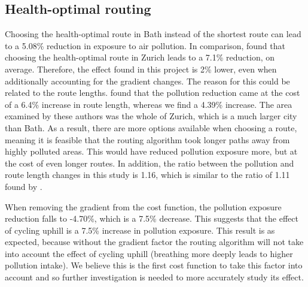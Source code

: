\documentclass[11pt,twosided,a4paper]{report}
\begin{document}
\subsection{Health-optimal routing} \label{disc:routing}

Choosing the health-optimal route in Bath instead of the shortest route can lead to a 5.08\% reduction in exposure to air pollution. In comparison, \cite{Hasenfratz2015highresmapsTram} found that choosing the health-optimal route in Zurich leads to a 7.1\% reduction, on average. Therefore, the effect found in this project is 2\% lower, even when additionally accounting for the gradient changes. The reason for this could be related to the route lengths. \citeauthor{Hasenfratz2015highresmapsTram} found that the pollution reduction came at the cost of a 6.4\% increase in route length, whereas we find a 4.39\% increase. The area examined by these authors was the whole of Zurich, which is a much larger city than Bath. As a result, there are more options available when choosing a route, meaning it is feasible that the routing algorithm took longer paths away from highly polluted areas. This would have reduced pollution exposure more, but at the cost of even longer routes. In addition, the ratio between the pollution and route length changes in this study is 1.16, which is similar to the ratio of 1.11 found by \cite{Hasenfratz2015highresmapsTram}.

When removing the gradient from the cost function, the pollution exposure reduction falls to -4.70\%, which is a 7.5\% decrease. This suggests that the effect of cycling uphill is a 7.5\% increase in pollution exposure. This result is as expected, because without the gradient factor the routing algorithm will not take into account the effect of cycling uphill (breathing more deeply leads to higher pollution intake). We believe this is the first cost function to take this factor into account and so further investigation is needed to more accurately study its effect.
\end{document}
